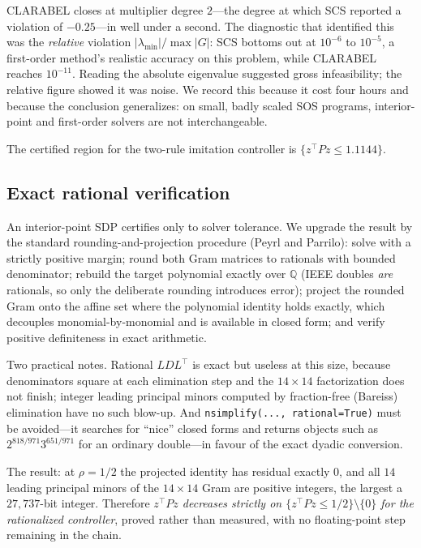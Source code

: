 \documentclass[11pt]{article}
\theoremstyle{plain}
\theoremstyle{definition}
\begin{document}
CLARABEL closes at multiplier degree $2$---the degree at which SCS reported a
violation of $-0.25$---in well under a second. The diagnostic that identified
this was the \emph{relative} violation $|\lambda_{\min}|/\max|G|$: SCS bottoms
out at $10^{-6}$ to $10^{-5}$, a first-order method's realistic accuracy on this
problem, while CLARABEL reaches $10^{-11}$. Reading the absolute eigenvalue
suggested gross infeasibility; the relative figure showed it was noise. We
record this because it cost four hours and because the conclusion generalizes:
on small, badly scaled SOS programs, interior-point and first-order solvers are
not interchangeable.

The certified region for the two-rule imitation controller is
$\{z^{\top}Pz\le1.1144\}$.

\subsection{Exact rational verification}

An interior-point SDP certifies only to solver tolerance. We upgrade the result
by the standard rounding-and-projection procedure (Peyrl and Parrilo): solve
with a strictly positive margin; round both Gram matrices to rationals with
bounded denominator; rebuild the target polynomial exactly over $\mathbb{Q}$
(IEEE doubles \emph{are} rationals, so only the deliberate rounding introduces
error); project the rounded Gram onto the affine set where the polynomial
identity holds exactly, which decouples monomial-by-monomial and is available in
closed form; and verify positive definiteness in exact arithmetic.

Two practical notes. Rational $LDL^{\top}$ is exact but useless at this size,
because denominators square at each elimination step and the $14\times14$
factorization does not finish; integer leading principal minors computed by
fraction-free (Bareiss) elimination have no such blow-up. And
\texttt{nsimplify(..., rational=True)} must be avoided---it searches for
``nice'' closed forms and returns objects such as $2^{818/971}3^{651/971}$ for
an ordinary double---in favour of the exact dyadic conversion.

The result: at $\rho=1/2$ the projected identity has residual exactly $0$, and
all $14$ leading principal minors of the $14\times14$ Gram are positive
integers, the largest a $27{,}737$-bit integer. Therefore
\emph{$z^{\top}Pz$ decreases strictly on $\{z^{\top}Pz\le1/2\}\setminus\{0\}$
for the rationalized controller}, proved rather than measured, with no
floating-point step remaining in the chain.
\end{document}
